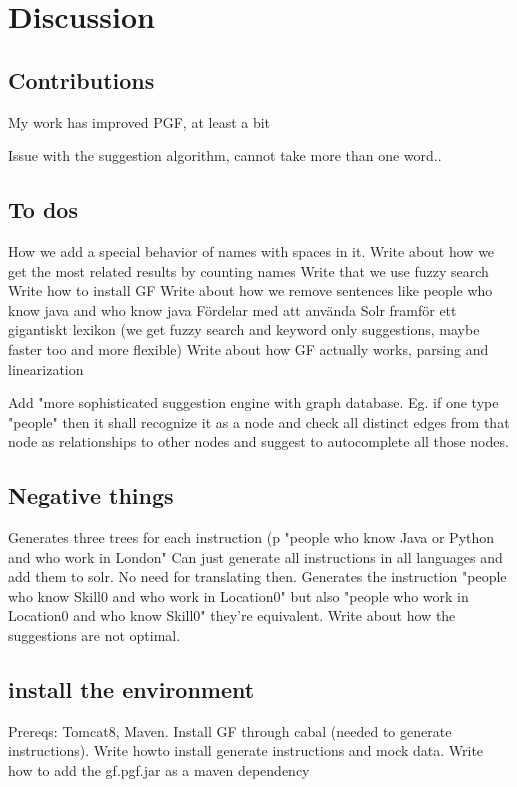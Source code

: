 \chapter{Discussion}\label{ch:discussion}

\section{Contributions}
My work has improved PGF, at least a bit


Issue with the suggestion algorithm, cannot take more than one word..

\section{To dos}
How we add a special behavior of names with spaces in it.
Write about how we get the most related results by counting names
Write that we use fuzzy search
Write how to install GF
Write about how we remove sentences like people who know java and who know java
Fördelar med att använda Solr framför ett gigantiskt lexikon (we get fuzzy search and keyword only suggestions, maybe faster too and more flexible)
Write about how GF actually works, parsing and linearization


Add "more sophisticated suggestion engine with graph database. Eg. if one type "people" then it shall recognize it as a node and check all distinct edges from that node as relationships to other nodes and suggest to autocomplete all those nodes.
\section{Negative things}
Generates three trees for each instruction (p "people who know Java or Python and who work in London"
Can just generate all instructions in all languages and add them to solr. No need for translating then.
Generates the instruction "people who know Skill0 and who work in Location0" but also "people who work in Location0 and who know Skill0" they're equivalent.
Write about how the suggestions are not optimal.

\section{install the environment}
Prereqs: Tomcat8, Maven. Install GF through cabal (needed to generate instructions). Write howto install generate instructions and mock data. Write how to add the gf.pgf.jar as a maven dependency

